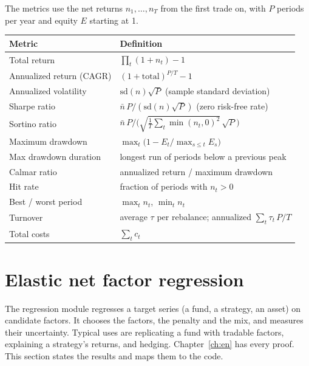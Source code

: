 The metrics use the net returns $n_1,\dots,n_T$ from the first trade on, with $P$ periods
per year and equity $E$ starting at 1.
\begin{center}\small
\begin{tabular}{@{}ll@{}}
\toprule
Metric & Definition \\
\midrule
Total return & $\prod_t(1+n_t)-1$ \\
Annualized return (CAGR) & $(1+\text{total})^{P/T}-1$ \\
Annualized volatility & $\mathrm{sd}(n)\sqrt P$ (sample standard deviation) \\
Sharpe ratio & $\bar n\,P/(\mathrm{sd}(n)\sqrt P)$ (zero risk-free rate) \\
Sortino ratio & $\bar n\,P/\big(\sqrt{\tfrac1T\sum_t\min(n_t,0)^2}\,\sqrt P\big)$ \\
Maximum drawdown & $\max_t\big(1-E_t/\max_{s\le t}E_s\big)$ \\
Max drawdown duration & longest run of periods below a previous peak \\
Calmar ratio & annualized return / maximum drawdown \\
Hit rate & fraction of periods with $n_t>0$ \\
Best / worst period & $\max_tn_t$, $\min_tn_t$ \\
Turnover & average $\tau$ per rebalance; annualized $\sum_t\tau_t\,P/T$ \\
Total costs & $\sum_tc_t$ \\
\bottomrule
\end{tabular}
\end{center}
\begin{codepointers}
\end{codepointers}

\chapter{Elastic net factor regression}\label{c:sec:regression}

The regression module regresses a target series (a fund, a strategy, an asset) on candidate
factors. It chooses the factors, the penalty and the mix, and measures their uncertainty.
Typical uses are replicating a fund with tradable factors, explaining a strategy's returns,
and hedging. Chapter~\ref{ch:en} has every
proof. This section states the results and maps them to the code.

